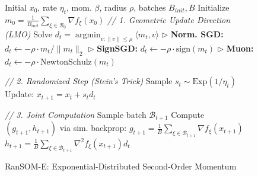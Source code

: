 \documentclass{article}
\theoremstyle{plain}
\theoremstyle{definition}
\theoremstyle{remark}
\DeclareMathOperator{\argmin}{argmin}
\begin{document}
\begin{figure}[t]
    \centering
    \begin{minipage}{0.48\textwidth}
        \begin{algorithm}[H]
            \caption{RanSOM-E: Exponential-Distributed Second-Order Momentum}
            \label{alg:expsom}
            \begin{algorithmic}[1]
                 Initial $x_0$, rate $\eta_t$, mom. $\beta$, radius $\rho$, batches $B_{init},B$
                \STATE Initialize $m_0 = \frac{1}{B_{init}} \sum_{\xi \in \mathcal{B}_0} \nabla f_{\xi}(x_0)$
                \STATE \textit{// 1. Geometric Update Direction (LMO)}
                \STATE Solve $d_t = \argmin_{v : \|v\| \le \rho} \langle m_t, v \rangle$
                \STATE \quad $\triangleright$ \textbf{Norm. SGD:} $d_t \leftarrow -\rho \cdot m_t / \|m_t\|_2$
                \STATE \quad $\triangleright$ \textbf{SignSGD:} $d_t \leftarrow -\rho \cdot \text{sign}(m_t)$
                \STATE \quad $\triangleright$ \textbf{Muon:} $d_t \leftarrow -\rho \cdot \text{NewtonSchulz}(m_t)$
                
                \STATE \textit{// 2. Randomized Step (Stein's Trick)}
                \STATE Sample $s_t \sim \mathrm{Exp}(1/\eta_t)$ 
                \STATE Update: $x_{t+1} = x_t + s_t d_t$
                
                \STATE \textit{// 3. Joint Computation}
                \STATE Sample batch $\mathcal{B}_{t+1}$
                \STATE Compute $(g_{t+1}, h_{t+1})$ via sim. backprop:
                \STATE \quad $g_{t+1} = \frac{1}{B} \sum_{\xi \in \mathcal{B}_{t+1}} \nabla f_{\xi}(x_{t+1})$
                \STATE \quad $h_{t+1} = \frac{1}{B} \sum_{\xi \in \mathcal{B}_{t+1}} \nabla^2 f_{\xi}(x_{t+1}) d_t$
                

\end{algorithmic}
\end{algorithm}
\end{minipage}
\end{figure}
\end{document}
